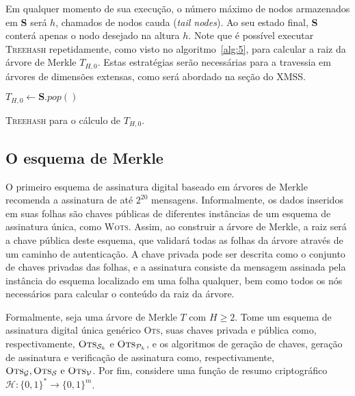 \documentclass[12pt,notitlepage]{report}
\newcommand{\hh}{\mathcal{H}}
\newcommand{\pk}{\mathcal{P}_k}
\newcommand{\sk}{\mathcal{S}_k}
\newcommand{\binwds}[1]{\{0, 1\}^{#1}}
\newcommand{\fhash}[1]{\hh{} : \binwds{*} \longrightarrow \binwds{#1}}
\begin{document}
Em qualquer momento de sua execução, o número máximo de nodos armazenados em
\textbf{S} será $h$, chamados de nodos cauda (\emph{tail nodes}). Ao seu estado
final, \textbf{S} conterá apenas o nodo desejado na altura $h$.
Note que é possível executar \textsc{Treehash} repetidamente, como visto no
algoritmo~\ref{alg:5}, para calcular a raiz da árvore de Merkle $T_{H,0}$.
Estas estratégias serão necessárias para a travessia em árvores de dimensões
extensas, como será abordado na seção do XMSS.

\begin{algorithm}[ht]
\vspace{2mm}
  $T_{H, 0} \longleftarrow \mathbf{S}.pop()$\;
  \vspace{2mm}
  \caption{\textsc{Treehash} para o cálculo de $T_{H,0}$.}
  \label{alg:5}
\end{algorithm}

\subsection{O esquema de Merkle}

O primeiro esquema de assinatura digital baseado em árvores de Merkle
\cite{Merkle:1989:CDS:118209.118230} recomenda a assinatura de até $2^{20}$
mensagens. Informalmente, os dados inseridos em suas folhas são chaves públicas
de diferentes instâncias de um esquema de assinatura única, como \textsc{Wots}.
Assim, ao construir a árvore de Merkle, a raiz será a chave pública deste
esquema, que validará todas as folhas da árvore através de um caminho de
autenticação. A chave privada pode ser descrita como o conjunto de chaves
privadas das folhas, e a assinatura consiste da mensagem assinada pela
instância do esquema localizado em uma folha qualquer, bem como todos os nós
necessários para calcular o conteúdo da raiz da árvore.

Formalmente, seja uma árvore de Merkle $T$ com $H \geq 2$. Tome um esquema de
assinatura digital única genérico \textsc{Ots}, suas chaves privada e pública
como, respectivamente, $\textsc{Ots}_{\sk{}}$ e $\textsc{Ots}_{\pk{}}$, e os
algoritmos de geração de chaves, geração de assinatura e verificação de
assinatura como, respectivamente, $\textsc{Ots}_\mathcal{G},
\textsc{Ots}_\mathcal{S} \text{ e } \textsc{Ots}_\mathcal{V}$. Por fim,
considere uma função de resumo criptográfico $\fhash{m}$.
\end{document}
